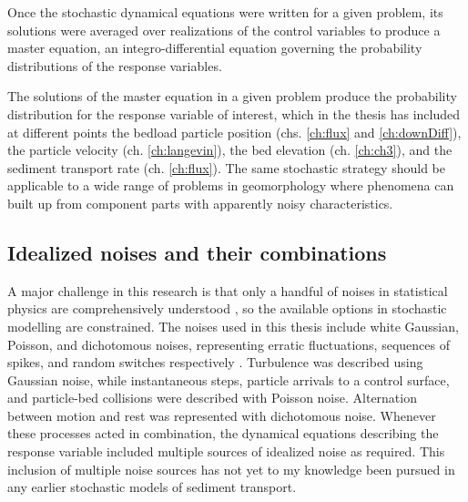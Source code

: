 Once the stochastic dynamical equations were written for a given problem, its solutions were averaged over realizations of the control variables to produce a master equation, an integro-differential equation governing the probability distributions of the response variables.

The solutions of the master equation in a given problem produce the probability distribution for the response variable of interest, which in the thesis has included at different points the bedload particle position (chs. \ref{ch:flux} and \ref{ch:downDiff}), the particle velocity (ch. \ref{ch:langevin}), the bed elevation (ch. \ref{ch:ch3}), and the sediment transport rate (ch. \ref{ch:flux}).
The same stochastic strategy should be applicable to a wide range of problems in geomorphology where phenomena can built up from component parts with apparently noisy characteristics.


\subsection{Idealized noises and their combinations}

A major challenge in this research is that only a handful of noises in statistical physics are comprehensively understood \citep{Horsthemke1984}, so the available options in stochastic modelling are constrained.
The noises used in this thesis include white Gaussian, Poisson, and dichotomous noises, representing erratic fluctuations, sequences of spikes, and random switches respectively \citep{VanDenBroeck1983}.
Turbulence was described using Gaussian noise, while instantaneous steps, particle arrivals to a control surface, and particle-bed collisions were described with Poisson noise. Alternation between motion and rest was represented with dichotomous noise.
Whenever these processes acted in combination, the dynamical equations describing the response variable included multiple sources of idealized noise as required.
This inclusion of multiple noise sources has not yet to my knowledge been pursued in any earlier stochastic models of sediment transport.

